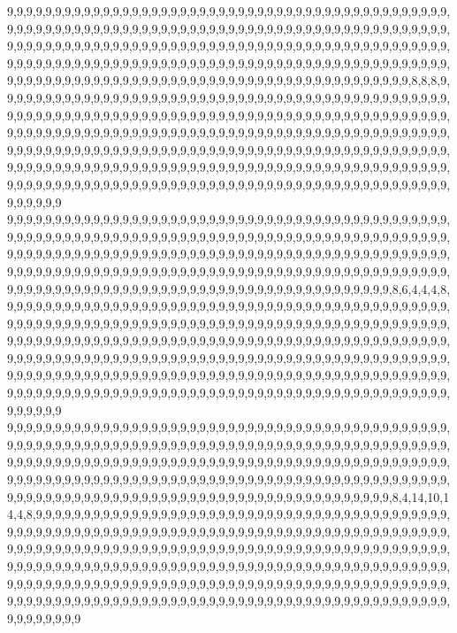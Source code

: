 9,9,9,9,9,9,9,9,9,9,9,9,9,9,9,9,9,9,9,9,9,9,9,9,9,9,9,9,9,9,9,9,9,9,9,9,9,9,9,9,9,9,9,9,9,9,9,9,9,9,9,9,9,9,9,9,9,9,9,9,9,9,9,9,9,9,9,9,9,9,9,9,9,9,9,9,9,9,9,9,9,9,9,9,9,9,9,9,9,9,9,9,9,9,9,9,9,9,9,9,9,9,9,9,9,9,9,9,9,9,9,9,9,9,9,9,9,9,9,9,9,9,9,9,9,9,9,9,9,9,9,9,9,9,9,9,9,9,9,9,9,9,9,9,9,9,9,9,9,9,9,9,9,9,9,9,9,9,9,9,9,9,9,9,9,9,9,9,9,9,9,9,9,9,9,9,9,9,9,9,9,9,9,9,9,9,9,9,9,9,9,9,9,9,9,9,9,9,9,9,9,9,9,9,9,9,9,9,9,9,9,9,9,9,9,9,9,9,9,9,9,9,9,9,9,9,8,8,8,9,9,9,9,9,9,9,9,9,9,9,9,9,9,9,9,9,9,9,9,9,9,9,9,9,9,9,9,9,9,9,9,9,9,9,9,9,9,9,9,9,9,9,9,9,9,9,9,9,9,9,9,9,9,9,9,9,9,9,9,9,9,9,9,9,9,9,9,9,9,9,9,9,9,9,9,9,9,9,9,9,9,9,9,9,9,9,9,9,9,9,9,9,9,9,9,9,9,9,9,9,9,9,9,9,9,9,9,9,9,9,9,9,9,9,9,9,9,9,9,9,9,9,9,9,9,9,9,9,9,9,9,9,9,9,9,9,9,9,9,9,9,9,9,9,9,9,9,9,9,9,9,9,9,9,9,9,9,9,9,9,9,9,9,9,9,9,9,9,9,9,9,9,9,9,9,9,9,9,9,9,9,9,9,9,9,9,9,9,9,9,9,9,9,9,9,9,9,9,9,9,9,9,9,9,9,9,9,9,9,9,9,9,9,9,9,9,9,9,9,9,9,9,9,9,9,9,9,9,9,9,9,9,9,9,9,9,9,9,9,9,9,9,9,9,9,9,9,9,9,9,9,9,9,9,9,9,9,9,9,9,9,9,9,9,9,9,9,9,9,9,9,9,9,9,9,9,9,9,9,9,9,9
9,9,9,9,9,9,9,9,9,9,9,9,9,9,9,9,9,9,9,9,9,9,9,9,9,9,9,9,9,9,9,9,9,9,9,9,9,9,9,9,9,9,9,9,9,9,9,9,9,9,9,9,9,9,9,9,9,9,9,9,9,9,9,9,9,9,9,9,9,9,9,9,9,9,9,9,9,9,9,9,9,9,9,9,9,9,9,9,9,9,9,9,9,9,9,9,9,9,9,9,9,9,9,9,9,9,9,9,9,9,9,9,9,9,9,9,9,9,9,9,9,9,9,9,9,9,9,9,9,9,9,9,9,9,9,9,9,9,9,9,9,9,9,9,9,9,9,9,9,9,9,9,9,9,9,9,9,9,9,9,9,9,9,9,9,9,9,9,9,9,9,9,9,9,9,9,9,9,9,9,9,9,9,9,9,9,9,9,9,9,9,9,9,9,9,9,9,9,9,9,9,9,9,9,9,9,9,9,9,9,9,9,9,9,9,9,9,9,9,9,9,9,9,9,8,6,4,4,4,8,9,9,9,9,9,9,9,9,9,9,9,9,9,9,9,9,9,9,9,9,9,9,9,9,9,9,9,9,9,9,9,9,9,9,9,9,9,9,9,9,9,9,9,9,9,9,9,9,9,9,9,9,9,9,9,9,9,9,9,9,9,9,9,9,9,9,9,9,9,9,9,9,9,9,9,9,9,9,9,9,9,9,9,9,9,9,9,9,9,9,9,9,9,9,9,9,9,9,9,9,9,9,9,9,9,9,9,9,9,9,9,9,9,9,9,9,9,9,9,9,9,9,9,9,9,9,9,9,9,9,9,9,9,9,9,9,9,9,9,9,9,9,9,9,9,9,9,9,9,9,9,9,9,9,9,9,9,9,9,9,9,9,9,9,9,9,9,9,9,9,9,9,9,9,9,9,9,9,9,9,9,9,9,9,9,9,9,9,9,9,9,9,9,9,9,9,9,9,9,9,9,9,9,9,9,9,9,9,9,9,9,9,9,9,9,9,9,9,9,9,9,9,9,9,9,9,9,9,9,9,9,9,9,9,9,9,9,9,9,9,9,9,9,9,9,9,9,9,9,9,9,9,9,9,9,9,9,9,9,9,9,9,9,9,9,9,9,9,9,9,9,9,9,9,9,9,9,9,9,9,9,9
9,9,9,9,9,9,9,9,9,9,9,9,9,9,9,9,9,9,9,9,9,9,9,9,9,9,9,9,9,9,9,9,9,9,9,9,9,9,9,9,9,9,9,9,9,9,9,9,9,9,9,9,9,9,9,9,9,9,9,9,9,9,9,9,9,9,9,9,9,9,9,9,9,9,9,9,9,9,9,9,9,9,9,9,9,9,9,9,9,9,9,9,9,9,9,9,9,9,9,9,9,9,9,9,9,9,9,9,9,9,9,9,9,9,9,9,9,9,9,9,9,9,9,9,9,9,9,9,9,9,9,9,9,9,9,9,9,9,9,9,9,9,9,9,9,9,9,9,9,9,9,9,9,9,9,9,9,9,9,9,9,9,9,9,9,9,9,9,9,9,9,9,9,9,9,9,9,9,9,9,9,9,9,9,9,9,9,9,9,9,9,9,9,9,9,9,9,9,9,9,9,9,9,9,9,9,9,9,9,9,9,9,9,9,9,9,9,9,9,9,9,9,9,9,8,4,14,10,14,4,8,9,9,9,9,9,9,9,9,9,9,9,9,9,9,9,9,9,9,9,9,9,9,9,9,9,9,9,9,9,9,9,9,9,9,9,9,9,9,9,9,9,9,9,9,9,9,9,9,9,9,9,9,9,9,9,9,9,9,9,9,9,9,9,9,9,9,9,9,9,9,9,9,9,9,9,9,9,9,9,9,9,9,9,9,9,9,9,9,9,9,9,9,9,9,9,9,9,9,9,9,9,9,9,9,9,9,9,9,9,9,9,9,9,9,9,9,9,9,9,9,9,9,9,9,9,9,9,9,9,9,9,9,9,9,9,9,9,9,9,9,9,9,9,9,9,9,9,9,9,9,9,9,9,9,9,9,9,9,9,9,9,9,9,9,9,9,9,9,9,9,9,9,9,9,9,9,9,9,9,9,9,9,9,9,9,9,9,9,9,9,9,9,9,9,9,9,9,9,9,9,9,9,9,9,9,9,9,9,9,9,9,9,9,9,9,9,9,9,9,9,9,9,9,9,9,9,9,9,9,9,9,9,9,9,9,9,9,9,9,9,9,9,9,9,9,9,9,9,9,9,9,9,9,9,9,9,9,9,9,9,9,9,9,9,9,9,9,9,9,9,9,9,9,9,9,9,9,9,9,9,9
